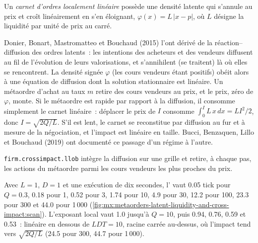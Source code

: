 \begin{definition}\label{def:mx:metaorders-latent-liquidity-and-cross-impact:linear}
Un \emph{carnet d'ordres localement linéaire} possède une densité latente qui s'annule au prix et croît linéairement en s'en éloignant,
$\varphi(x)=L\,|x-p|$, où $L$ désigne la liquidité par unité de prix au carré.
\end{definition}

Donier, Bonart, Mastromatteo et Bouchaud (2015) l'ont dérivé de la réaction--diffusion des ordres latents~: les intentions des acheteurs et des vendeurs diffusent au fil
de l'évolution de leurs valorisations, et s'annihilent (se traitent) là où elles se rencontrent. La densité signée $\varphi$ (les cours vendeurs étant positifs) obéit alors à une équation de diffusion
dont la solution stationnaire est linéaire. Un métaordre d'achat au taux $m$ retire des cours vendeurs au prix, et le prix, zéro de $\varphi$, monte. Si le métaordre est
rapide par rapport à la diffusion, il consomme simplement le carnet linéaire~: déplacer le prix de $I$ consomme $\int_0^IL\,x\,dx=LI^2/2$, donc $I=\sqrt{2Q/L}$. S'il est
lent, le carnet se reconstitue par diffusion au fur et à mesure de la négociation, et l'impact est linéaire en taille. Bucci, Benzaquen, Lillo et Bouchaud (2019) ont documenté ce passage d'un régime à l'autre.

\texttt{firm.crossimpact.llob} intègre la diffusion sur une grille et retire, à chaque pas, les actions du métaordre parmi les cours vendeurs les plus proches du prix.

\label{lst:mx:metaorders-latent-liquidity-and-cross-impact:llob}

Avec $L=1$, $D=1$ et une exécution de dix secondes, l' vaut 0.05 tick pour $Q=0.3$, 0.18 pour 1, 0.52 pour 3, 1.74 pour 10, 4.9 pour 30, 12.2 pour 100, 23.3 pour 300 et
44.0 pour 1\,000 (\cref{fig:mx:metaorders-latent-liquidity-and-cross-impact:scan}). L'exposant local vaut 1.0 jusqu'à $Q=10$, puis 0.94, 0.76, 0.59 et 0.53~: linéaire
en dessous de $LDT=10$, racine carrée au-dessus, où l'impact tend vers $\sqrt{2Q/L}$ (24.5 pour 300, 44.7 pour 1\,000).

